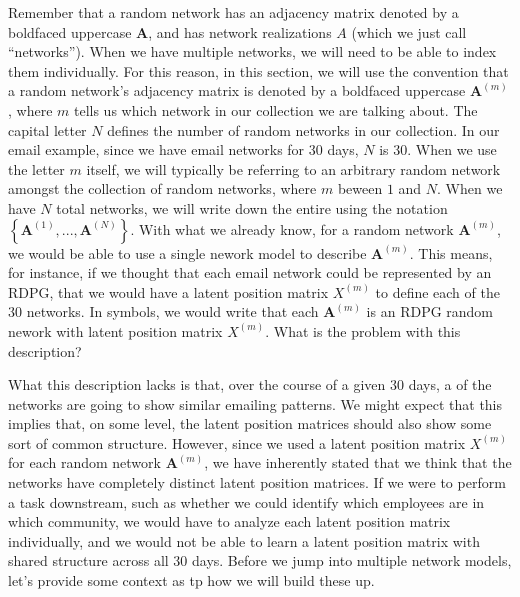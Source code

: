 \documentclass[letterpaper,10pt,english]{jupyterBook}
\begin{document}
\sphinxAtStartPar
Remember that a random network has an adjacency matrix denoted by a boldfaced uppercase \(\mathbf A\), and has network realizations \(A\) (which we just call “networks”). When we have multiple networks, we will need to be able to index them individually. For this reason, in this section, we will use the convention that a random network’s adjacency matrix is denoted by a boldfaced uppercase \(\mathbf A^{(m)}\), where \(m\) tells us which network in our collection we are talking about. The capital letter \(N\) defines the  number of random networks in our collection. In our email example, since we have email networks for \(30\) days, \(N\) is \(30\). When we use the letter \(m\) itself, we will typically be referring to an arbitrary random network amongst the collection of random networks, where \(m\) beween \(1\) and \(N\). When we have \(N\) total networks, we will write down the entire  using the notation \(\left\{\mathbf A^{(1)}, ..., \mathbf A^{(N)}\right\}\). With what we already know, for a random network \(\mathbf A^{(m)}\), we would be able to use a single nework model to describe \(\mathbf A^{(m)}\). This means, for instance, if we thought that each email network could be represented by an RDPG, that we would have a  latent position matrix \(X^{(m)}\) to define each of the \(30\) networks. In symbols, we would write that each \(\mathbf A^{(m)}\) is an RDPG random nework with latent position matrix \(X^{(m)}\). What is the problem with this description?

\sphinxAtStartPar
What this description lacks is that, over the course of a given \(30\) days, a  of the networks are going to show similar emailing patterns. We might expect that this implies that, on some level, the latent position matrices should also show some sort of common structure. However, since we used a  latent position matrix \(X^{(m)}\) for each random network \(\mathbf A^{(m)}\), we have inherently stated that we think that the networks have completely distinct latent position matrices. If we were to perform a task downstream, such as whether we could identify which employees are in which community, we would have to analyze each latent position matrix individually, and we would not be able to learn a latent position matrix with shared structure across all \(30\) days. Before we jump into multiple network models, let’s provide some context as tp how we will build these up.
\end{document}
